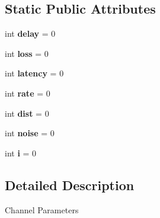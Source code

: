 \subsection*{Static Public Attributes}
\begin{DoxyCompactItemize}
\item 
\hypertarget{classmininet_1_1wifiChannel_1_1channelParameters_a0ea61ec1fa1243297a503abecd8695a2}{int {\bfseries delay} = 0}\label{classmininet_1_1wifiChannel_1_1channelParameters_a0ea61ec1fa1243297a503abecd8695a2}

\item 
\hypertarget{classmininet_1_1wifiChannel_1_1channelParameters_a5e741fb73b0ae594cce68fb5718a92b6}{int {\bfseries loss} = 0}\label{classmininet_1_1wifiChannel_1_1channelParameters_a5e741fb73b0ae594cce68fb5718a92b6}

\item 
\hypertarget{classmininet_1_1wifiChannel_1_1channelParameters_a1d8388c682f386919b36d85d69b16ec7}{int {\bfseries latency} = 0}\label{classmininet_1_1wifiChannel_1_1channelParameters_a1d8388c682f386919b36d85d69b16ec7}

\item 
\hypertarget{classmininet_1_1wifiChannel_1_1channelParameters_a90931cd3ce87f75886e4b3c87ba1b4f5}{int {\bfseries rate} = 0}\label{classmininet_1_1wifiChannel_1_1channelParameters_a90931cd3ce87f75886e4b3c87ba1b4f5}

\item 
\hypertarget{classmininet_1_1wifiChannel_1_1channelParameters_acc1e42e6b2368846e013a9ee5b88bf80}{int {\bfseries dist} = 0}\label{classmininet_1_1wifiChannel_1_1channelParameters_acc1e42e6b2368846e013a9ee5b88bf80}

\item 
\hypertarget{classmininet_1_1wifiChannel_1_1channelParameters_a10132fc554eac46d41136a6364b1e6da}{int {\bfseries noise} = 0}\label{classmininet_1_1wifiChannel_1_1channelParameters_a10132fc554eac46d41136a6364b1e6da}

\item 
\hypertarget{classmininet_1_1wifiChannel_1_1channelParameters_a60c5fac994a86c932d3d312ce26ed1d4}{int {\bfseries i} = 0}\label{classmininet_1_1wifiChannel_1_1channelParameters_a60c5fac994a86c932d3d312ce26ed1d4}

\end{DoxyCompactItemize}


\subsection{Detailed Description}
\begin{DoxyVerb}Channel Parameters\end{DoxyVerb}
 


